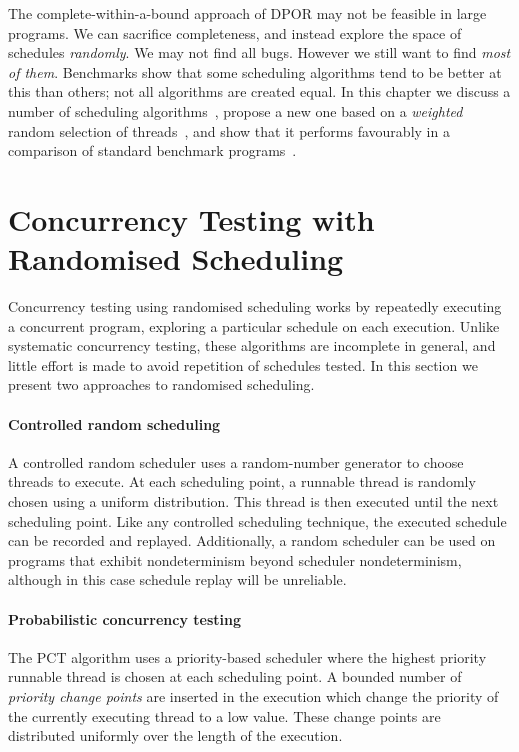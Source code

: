 The complete-within-a-bound approach of DPOR may not be feasible in
large programs.  We can sacrifice completeness, and instead explore
the space of schedules \emph{randomly}.  We may not find all bugs.
However we still want to find \emph{most of them}.  Benchmarks show
that some scheduling algorithms tend to be better at this than others;
not all algorithms are created equal.  In this chapter we discuss a
number of scheduling algorithms~, propose a new
one based on a \emph{weighted} random selection of
threads~, and show that it performs favourably
in a comparison of standard benchmark programs~.

\section{Concurrency Testing with Randomised Scheduling}
\label{sec:algorithms-usual}

Concurrency testing using randomised scheduling works by repeatedly
executing a concurrent program, exploring a particular schedule on
each execution.  Unlike systematic concurrency testing, these
algorithms are incomplete in general, and little effort is made to
avoid repetition of schedules tested.  In this section we present two
approaches to randomised scheduling.

\paragraph{Controlled random scheduling}
A controlled random scheduler uses a random-number generator to choose threads
to execute.  At each scheduling point, a runnable thread is randomly chosen
using a uniform distribution.  This thread is then executed until the next
scheduling point.  Like any controlled scheduling technique, the executed
schedule can be recorded and replayed.  Additionally, a random scheduler can be
used on programs that exhibit nondeterminism beyond scheduler nondeterminism,
although in this case schedule replay will be unreliable\cite{thomson2016}.

\paragraph{Probabilistic concurrency testing}
The PCT algorithm\cite{burckhardt2010} uses a priority-based scheduler where the
highest priority runnable thread is chosen at each scheduling point.  A bounded
number of \emph{priority change points} are inserted in the execution which
change the priority of the currently executing thread to a low value.  These
change points are distributed uniformly over the length of the execution.

